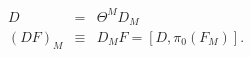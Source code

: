 \begin{equation}\label{DIRA}
\begin{array}{ccc}
D & = & \Theta^M D_M \\
(DF)_M & \equiv & D_M F = [D, \pi_0(F_M)].
\end{array}
\end{equation}

